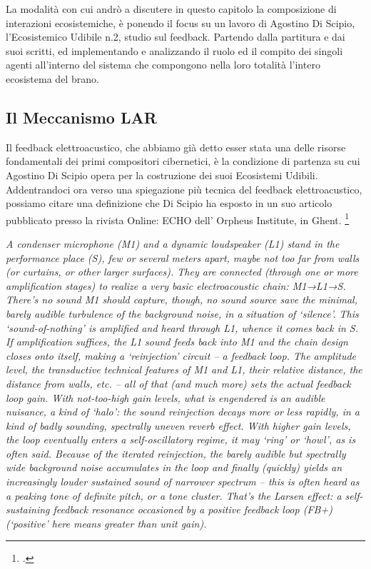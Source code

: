 La modalità con cui andrò a discutere in questo capitolo la composizione di interazioni ecosistemiche, 
è ponendo il focus su un lavoro di Agostino Di Scipio, l’Ecosistemico Udibile n.2, studio sul feedback. 
Partendo dalla partitura e dai suoi scritti, ed implementando e analizzando
il ruolo ed il compito dei singoli agenti all'interno del sistema 
che compongono nella loro totalità l'intero ecosistema del brano. 

\subsection{Il Meccanismo LAR}
\label{sec:Il Meccanismo LAR}
Il feedback elettroacustico, che abbiamo già detto
esser stata una delle risorse fondamentali dei primi compositori cibernetici,
è la condizione di partenza su cui Agostino Di Scipio opera per la costruzione dei suoi Ecosistemi Udibili.
Addentrandoci ora verso una spiegazione più tecnica del feedback elettroacustico,
possiamo citare una definizione che Di Scipio ha esposto in un suo articolo
pubblicato presso la rivista Online: ECHO dell’ Orpheus Institute, in
Ghent. \footcite{di_scipio_relational_2022}

\begin{center}
\vspace{0.5cm}
\textit{A condenser microphone (M1) and a dynamic loudspeaker (L1) stand in the performance place
(S), few or several meters apart, maybe not too far from walls (or curtains, or other larger
surfaces). They are connected (through one or more amplification stages) to realize a very
basic electroacoustic chain: M1→L1→S. There’s no sound M1 should capture, though, no sound
source save the minimal, barely audible turbulence of the background noise, in a situation of
‘silence’. This ‘sound-of-nothing’ is amplified and heard through L1, whence it comes back in
S. \\
If amplification suffices, the L1 sound feeds back into M1 and the chain design closes onto
itself, making a ‘reinjection’ circuit – a feedback loop. The amplitude level, the
transductive technical features of M1 and L1, their relative distance, the distance from
walls, etc. – all of that (and much more) sets the actual feedback loop gain. With
not-too-high gain levels, what is engendered is an audible nuisance, a kind of ‘halo’: the
sound reinjection decays more or less rapidly, in a kind of badly sounding, spectrally uneven
reverb effect. With higher gain levels, the loop eventually enters a self-oscillatory regime,
it may ‘ring’ or ‘howl’, as is often said. Because of the iterated reinjection, the barely
audible but spectrally wide background noise accumulates in the loop and finally (quickly)
yields an increasingly louder sustained sound of narrower spectrum – this is often heard as a
peaking tone of definite pitch, or a tone cluster. That’s the Larsen effect: a self-sustaining
feedback resonance occasioned by a positive feedback loop (FB+) (‘positive’ here means greater
than unit gain).}
\vspace{0.5cm}
\vspace{0.5cm}
\end{center}

